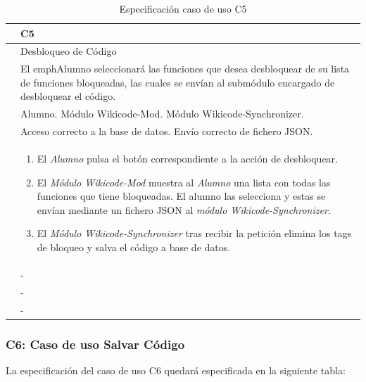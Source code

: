 \begin{table}[h]
\centering
\begin{tabular}{ | p{} | p{} | }
	\hline
	\cellcolor[gray]{.8}{ID} & C5 \\
	\hline 
	\cellcolor[gray]{.8}{Nombre} &  Desbloqueo de Código\\
	\hline
	\cellcolor[gray]{.8}{Descripción} &  El emph{Alumno} seleccionará las funciones que desea desbloquear de su lista de funciones bloqueadas, las cuales se envían al submódulo encargado de desbloquear el código.  \\
	\hline
	\cellcolor[gray]{.8}{Actores} &  Alumno. Módulo Wikicode-Mod. Módulo Wikicode-Synchronizer.\\
	\hline
	\cellcolor[gray]{.8}{Asunciones} & Acceso correcto a la base de datos. Envío correcto de fichero JSON. \\
	\hline
	\cellcolor[gray]{.8}{Pasos} & \begin{enumerate}
		\item El \emph{Alumno} pulsa el botón correspondiente a la acción de desbloquear.
		\item El \emph{Módulo Wikicode-Mod} muestra al \emph{Alumno} una lista con todas las funciones que tiene bloqueadas. El alumno las selecciona y estas se envían mediante un fichero JSON al \emph{módulo Wikicode-Synchronizer}.
		\item El \emph{Módulo Wikicode-Synchronizer} tras recibir la petición elimina los tags de bloqueo y salva el código a base de datos. 
		\end{enumerate} \\
	\hline
	\cellcolor[gray]{.8}{Variaciones} & - \\
	\hline
	\cellcolor[gray]{.8}{Requisitos no funcionales} & - \\
	\hline
	\cellcolor[gray]{.8}{Cuestiones} & - \\
	\hline
	
\end{tabular}
\caption{Especificación caso de uso C5}
\end{table}

\newpage
\subsubsection{C6: Caso de uso Salvar Código}

La especificación del caso de uso C6 quedará especificada en la siguiente tabla:

